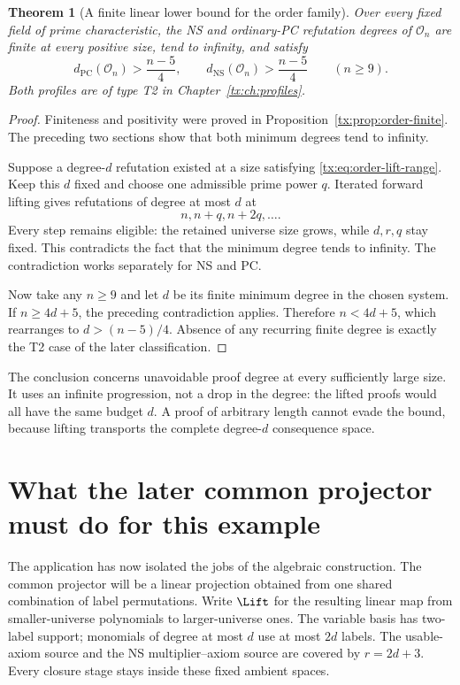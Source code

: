 \documentclass[11pt,a4paper,oneside,openany]{book}
\newtheorem{theorem}{Theorem}[chapter]
\theoremstyle{definition}\newtheorem{definition}[theorem]{Definition}
\theoremstyle{remark}\newtheorem{remark}[theorem]{Remark}
\newcommand{\NS}{\mathrm{NS}}\newcommand{\PC}{\mathrm{PC}}
\numberwithin{equation}{chapter}
\begin{document}
\begin{theorem}[A finite linear lower bound for the order family]
\label{tx:thm:order-linear}
Over every fixed field of prime characteristic, the NS and ordinary-PC
refutation degrees of $\mathcal O_n$ are finite at every positive
size, tend to infinity, and satisfy
\begin{equation}\label{tx:eq:order-linear-bound}
 d_{\PC}(\mathcal O_n)>\frac{n-5}{4},\qquad
 d_{\NS}(\mathcal O_n)>\frac{n-5}{4}\qquad(n\ge9).
\end{equation}
Both profiles are of type T2 in Chapter~\ref{tx:ch:profiles}.
\end{theorem}
\begin{proof}
Finiteness and positivity were proved in
Proposition~\ref{tx:prop:order-finite}. The preceding two sections show
that both minimum degrees tend to infinity.

Suppose a degree-$d$ refutation existed at a size satisfying
\eqref{tx:eq:order-lift-range}. Keep this $d$ fixed and choose one
admissible prime power $q$. Iterated forward lifting gives refutations
of degree at most $d$ at
\[
                            n,n+q,n+2q,\ldots.
\]
Every step remains eligible: the retained universe size grows, while $d,r,q$
stay fixed. This contradicts the fact that the minimum degree tends
to infinity. The contradiction works separately for NS and PC.

Now take any $n\ge9$ and let $d$ be its finite minimum degree in the
chosen system. If $n\ge4d+5$, the preceding contradiction applies.
Therefore $n<4d+5$, which rearranges to
$d>(n-5)/4$. Absence of any recurring finite degree is exactly the
T2 case of the later classification.
\end{proof}

The conclusion concerns unavoidable proof degree at every sufficiently
large size. It uses an infinite progression, not a drop in the degree:
the lifted proofs would all have the same budget $d$. A proof of
arbitrary length cannot evade the bound, because lifting transports
the complete degree-$d$ consequence space.

\section{What the later common projector must do for this example}
The application has now isolated the jobs of the algebraic construction.
The common projector will be a linear projection obtained from one
shared combination of label permutations. Write $\Lift$ for the
resulting linear map from smaller-universe polynomials to larger-universe ones.
The variable basis has two-label support; monomials of degree at most
$d$ use at most $2d$ labels. The usable-axiom source and the NS
multiplier--axiom source are covered by $r=2d+3$. Every closure stage
stays inside these fixed ambient spaces.
\end{document}
